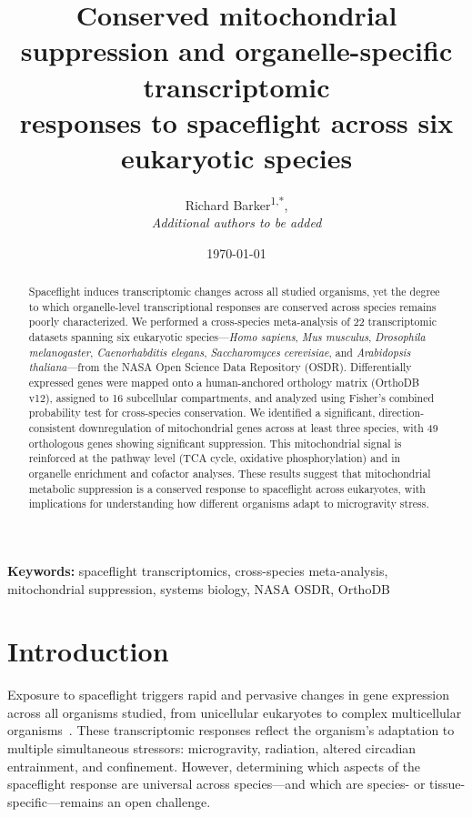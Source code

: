 \documentclass[11pt,a4paper]{article}
\title{
    Conserved mitochondrial suppression and organelle-specific transcriptomic \\
    responses to spaceflight across six eukaryotic species
}
\author{
    Richard Barker\textsuperscript{1,*}, \\
    \textit{Additional authors to be added}
}
\date{\today}
\begin{document}
\maketitle

\begin{abstract}
    Spaceflight induces transcriptomic changes across all studied organisms, yet the 
    degree to which organelle-level transcriptional responses are conserved across 
    species remains poorly characterized. We performed a cross-species meta-analysis 
    of 22 transcriptomic datasets spanning six eukaryotic species—\textit{Homo sapiens}, 
    \textit{Mus musculus}, \textit{Drosophila melanogaster}, \textit{Caenorhabditis elegans}, 
    \textit{Saccharomyces cerevisiae}, and \textit{Arabidopsis thaliana}—from the NASA 
    Open Science Data Repository (OSDR). Differentially expressed genes were mapped 
    onto a human-anchored orthology matrix (OrthoDB v12), assigned to 16 subcellular 
    compartments, and analyzed using Fisher's combined probability test for cross-species 
    conservation. We identified a significant, direction-consistent downregulation of 
    mitochondrial genes across at least three species, with 49 orthologous genes showing 
    significant suppression. This mitochondrial signal is reinforced at the pathway level 
    (TCA cycle, oxidative phosphorylation) and in organelle enrichment and cofactor analyses. 
    These results suggest that mitochondrial metabolic suppression is a conserved response 
    to spaceflight across eukaryotes, with implications for understanding how different 
    organisms adapt to microgravity stress.
\end{abstract}

\noindent
\textbf{Keywords:} spaceflight transcriptomics, cross-species meta-analysis, 
mitochondrial suppression, systems biology, NASA OSDR, OrthoDB

\newpage

\section{Introduction}
\label{sec:intro}

Exposure to spaceflight triggers rapid and pervasive changes in gene expression 
across all organisms studied, from unicellular eukaryotes to complex multicellular 
organisms~\cite{OSDR2020}. These transcriptomic responses reflect the organism's 
adaptation to multiple simultaneous stressors: microgravity, radiation, altered 
circadian entrainment, and confinement. However, determining which aspects of the 
spaceflight response are universal across species—and which are species- or 
tissue-specific—remains an open challenge.
\end{document}
